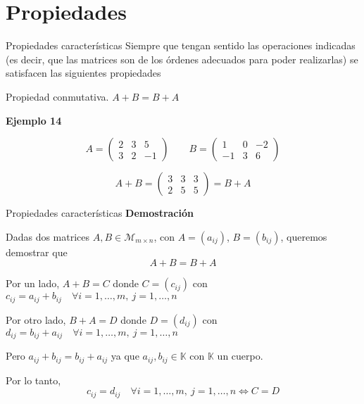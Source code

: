 \documentclass[
  ignorenonframetext,
]{beamer}
\begin{document}
\hypertarget{propiedades}{%
\section{Propiedades}\label{propiedades}}

\begin{frame}{Propiedades características}
\protect\hypertarget{propiedades-caracteruxedsticas}{}
Siempre que tengan sentido las operaciones indicadas (es decir, que las
matrices son de los órdenes adecuados para poder realizarlas) se
satisfacen las siguientes propiedades

Propiedad conmutativa. \(A+B=B+A\)

\textbf{Ejemplo 14}

\[A = \begin{pmatrix}2&3&5\\3&2&-1\end{pmatrix}\qquad B=\begin{pmatrix}1&0&-2\\-1&3&6\end{pmatrix}\]

\[A+B = \begin{pmatrix}3&3&3\\2&5&5\end{pmatrix} = B+A\]
\end{frame}

\begin{frame}{Propiedades características}
\protect\hypertarget{propiedades-caracteruxedsticas-1}{}
\textbf{Demostración}

Dadas dos matrices \(A,B\in\mathcal{M}_{m\times n}\), con
\(A = (a_{ij})\), \(B=(b_{ij})\), queremos demostrar que \[A+B = B+A\]

Por un lado, \(A+B = C\) donde \(C = (c_{ij})\) con
\(c_{ij} = a_{ij}+b_{ij}\quad\forall i=1,\dots,m,\ j=1,\dots,n\)

Por otro lado, \(B+A = D\) donde \(D = (d_{ij})\) con
\(d_{ij} = b_{ij}+a_{ij}\quad\forall i=1,\dots,m,\ j=1,\dots,n\)

Pero \(a_{ij}+b_{ij} = b_{ij}+a_{ij}\) ya que
\(a_{ij},b_{ij}\in\mathbb{K}\) con \(\mathbb{K}\) un cuerpo.

Por lo tanto,
\[c_{ij} = d_{ij}\quad\forall i=1,\dots,m,\ j=1,\dots,n\Leftrightarrow C = D \]
\end{frame}
\end{document}
